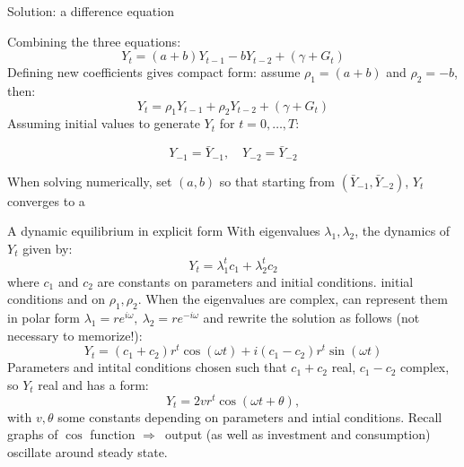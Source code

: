 \documentclass{beamer}
\newcommand{\tb}[1]{{\color{blue}{\textbf{#1}}}}
\newcommand{\rarr}{$\Rightarrow$\ }
\begin{document}
\begin{frame}{Solution: a difference equation}

  Combining the three equations:
  $$
Y_t = (a+b) Y_{t-1} - b Y_{t-2} + (\gamma + G_t)
$$
\vfill
Defining new coefficients gives compact form: assume $\rho_1 = (a+b)$ and $\rho_2 = -b$, then:
$$
Y_t = \rho_1 Y_{t-1} + \rho_2 Y_{t-2} + (\gamma + G_t) 
$$
\vfill
Assuming initial values to generate ${Y_t}$ for $ t=0, \ldots, T $:

$$
Y_{-1} = \bar Y_{-1}, \quad  Y_{-2} = \bar Y_{-2}
$$

When solving numerically, set $(a,b) $ so that starting from
$(\bar Y_{-1}, \bar Y_{-2})$,  ${Y_t}$ converges to
a \tb{steady state}

\end{frame}

\begin{frame}{A dynamic equilibrium in explicit form}
  With eigenvalues $\lambda_1, \lambda_2$, the dynamics of $Y_t$ given by:
  $$
Y_t = \lambda_1^t c_1 + \lambda_2^t c_2
$$
where $ c_1 $ and $ c_2 $ are constants on parameters and initial conditions.
initial conditions and on $ \rho_1, \rho_2 $.
\vfill
When the eigenvalues are complex, can represent them in polar form $
\lambda_1 =  r e^{i \omega}, \  \lambda_2 = r e^{-i \omega}
$ and rewrite the solution as follows (\alert{not necessary to memorize!}):
$$
  Y_t =  (c_1 + c_2) r^t \cos(\omega t) + i (c_1 - c_2) r^t \sin(\omega t)
$$
Parameters and intital conditions chosen such that $c_1+c_2$ real, $c_1-c_2$ complex, so $Y_t$ real and has a form:
$$Y_t = 2 v r^t  \cos (\omega t + \theta),$$ with $v, \theta$ some constants depending on parameters and intial conditions.
\vfill
Recall graphs of $\cos$ function \rarr output (as well as investment and consumption) oscillate around steady state.
\end{frame}
\end{document}
